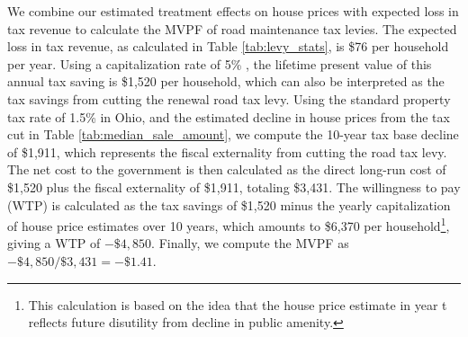 We combine our estimated treatment effects on house prices with expected loss in tax revenue to calculate the MVPF of road maintenance tax levies. The expected loss in tax revenue, as calculated in Table \ref{tab:levy_stats}, is \$76 per household per year. Using a capitalization rate of 5\% \citep{hilber2011economic, cellini2010value}, the lifetime present value of this annual tax saving is \$1,520 per household, which can also be interpreted as the tax savings from cutting the renewal road tax levy. Using the standard property tax rate of 1.5\% in Ohio, and the estimated decline in house prices from the tax cut in Table \ref{tab:median_sale_amount}, we compute the 10-year tax base decline of \$1,911, which represents the fiscal externality from cutting the road tax levy. The net cost to the government is then calculated as the direct long-run cost of \$1,520 plus the fiscal externality of \$1,911, totaling \$3,431. The willingness to pay (WTP) is calculated as the tax savings of \$1,520 minus the yearly capitalization of house price estimates over 10 years, which amounts to \$6,370 per household\footnote{This calculation is based on the idea that the house price estimate in year t reflects future disutility from decline in public amenity.}, giving a WTP of \(-\$4,850\). Finally, we compute the MVPF as \(-\$4,850 / \$3,431 = -\$1.41\). 



